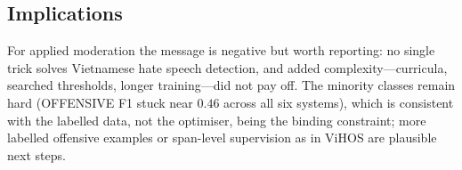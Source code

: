 \subsection{Implications}
For applied moderation the message is negative but worth reporting: no single trick
solves Vietnamese hate speech detection, and added complexity---curricula, searched
thresholds, longer training---did not pay off.  The
minority classes remain hard
(OFFENSIVE F1 stuck near $0.46$ across all six systems), which is consistent with
the labelled data, not the optimiser, being the binding constraint; more labelled
offensive examples or span-level supervision as in ViHOS \cite{hoang2023vihos}
are plausible next steps.
